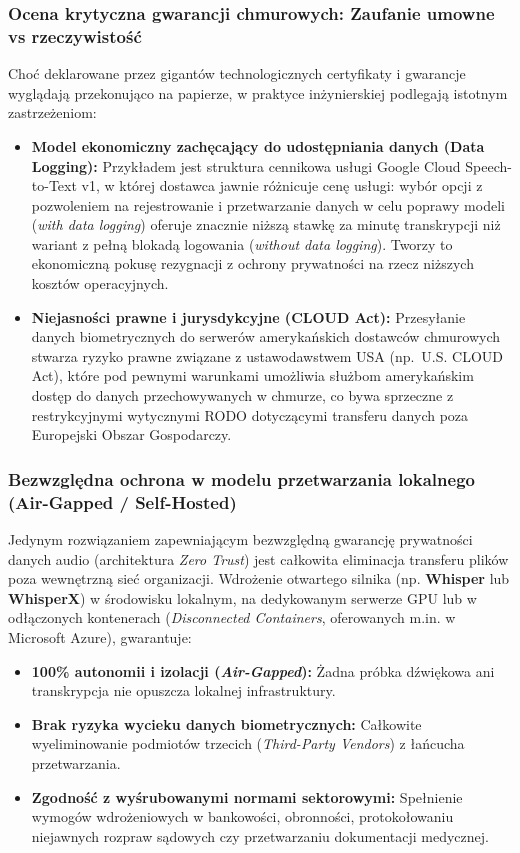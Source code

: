\subsubsection{Ocena krytyczna gwarancji chmurowych: Zaufanie umowne vs rzeczywistość}

Choć deklarowane przez gigantów technologicznych certyfikaty i gwarancje wyglądają przekonująco na papierze, w praktyce inżynierskiej podlegają istotnym zastrzeżeniom:

\begin{itemize}
    \item \textbf{Model ekonomiczny zachęcający do udostępniania danych (Data Logging):} Przykładem jest struktura cennikowa usługi Google Cloud Speech-to-Text v1, w której dostawca jawnie różnicuje cenę usługi: wybór opcji z pozwoleniem na rejestrowanie i przetwarzanie danych w celu poprawy modeli (\textit{with data logging}) oferuje znacznie niższą stawkę za minutę transkrypcji niż wariant z pełną blokadą logowania (\textit{without data logging}). Tworzy to ekonomiczną pokusę rezygnacji z ochrony prywatności na rzecz niższych kosztów operacyjnych.
    \item \textbf{Niejasności prawne i jurysdykcyjne (CLOUD Act):} Przesyłanie danych biometrycznych do serwerów amerykańskich dostawców chmurowych stwarza ryzyko prawne związane z ustawodawstwem USA (np.~U.S. CLOUD Act), które pod pewnymi warunkami umożliwia służbom amerykańskim dostęp do danych przechowywanych w chmurze, co bywa sprzeczne z restrykcyjnymi wytycznymi RODO dotyczącymi transferu danych poza Europejski Obszar Gospodarczy.
\end{itemize}

\subsubsection{Bezwzględna ochrona w modelu przetwarzania lokalnego (Air-Gapped / Self-Hosted)}

Jedynym rozwiązaniem zapewniającym bezwzględną gwarancję prywatności danych audio (architektura \textit{Zero Trust}) jest całkowita eliminacja transferu plików poza wewnętrzną sieć organizacji. Wdrożenie otwartego silnika (np. \textbf{Whisper} lub \textbf{WhisperX}) w środowisku lokalnym, na dedykowanym serwerze GPU lub w odłączonych kontenerach (\textit{Disconnected Containers}, oferowanych m.in. w Microsoft Azure), gwarantuje:
\begin{itemize}
    \item \textbf{100\% autonomii i izolacji (\textit{Air-Gapped}):} Żadna próbka dźwiękowa ani transkrypcja nie opuszcza lokalnej infrastruktury.
    \item \textbf{Brak ryzyka wycieku danych biometrycznych:} Całkowite wyeliminowanie podmiotów trzecich (\textit{Third-Party Vendors}) z łańcucha przetwarzania.
    \item \textbf{Zgodność z wyśrubowanymi normami sektorowymi:} Spełnienie wymogów wdrożeniowych w bankowości, obronności, protokołowaniu niejawnych rozpraw sądowych czy przetwarzaniu dokumentacji medycznej.
\end{itemize}

